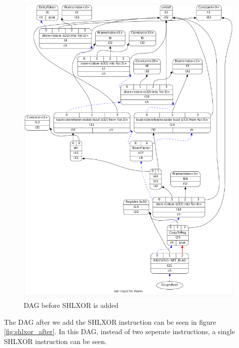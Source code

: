 \begin{figure}[h!]
    \centering
    \includegraphics[scale= 0.3]{adding_new_instr/shlxor_before.png}
    \caption{DAG before SHLXOR is added}
    \label{fig:shlxor_before}
\end{figure}

The DAG after we add the SHLXOR instruction can be seen in figure \ref{fig:shlxor_after}. In this DAG, instead of two seperate instructions, a single SHLXOR instruction can be seen.

